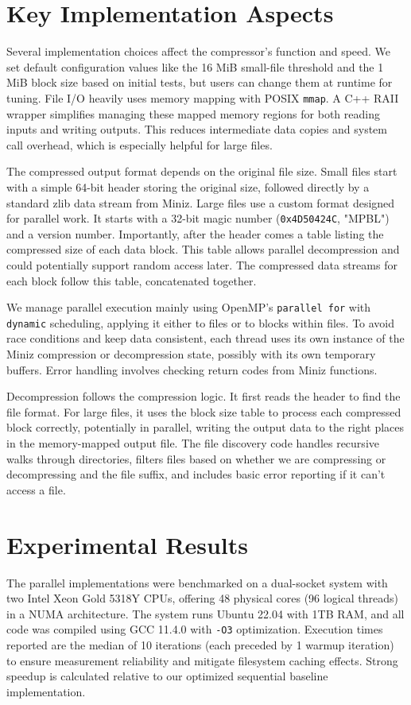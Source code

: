 \documentclass[10pt]{article}
\newcommand{\code}[1]{\texttt{#1}}
\begin{document}
\section{Key Implementation Aspects}

Several implementation choices affect the compressor's function and speed. We set default configuration values like the 16 MiB small-file threshold and the 1 MiB block size based on initial tests, but users can change them at runtime for tuning.
File I/O heavily uses memory mapping with POSIX \code{mmap}. A C++ RAII wrapper simplifies managing these mapped memory regions for both reading inputs and writing outputs. This reduces intermediate data copies and system call overhead, which is especially helpful for large files.

The compressed output format depends on the original file size. Small files start with a simple 64-bit header storing the original size, followed directly by a standard zlib data stream from Miniz. Large files use a custom format designed for parallel work. It starts with a 32-bit magic number (\code{0x4D50424C}, "MPBL") and a version number. Importantly, after the header comes a table listing the compressed size of each data block. This table allows parallel decompression and could potentially support random access later. The compressed data streams for each block follow this table, concatenated together.

We manage parallel execution mainly using OpenMP's \code{parallel for} with \code{dynamic} scheduling, applying it either to files or to blocks within files. To avoid race conditions and keep data consistent, each thread uses its own instance of the Miniz compression or decompression state, possibly with its own temporary buffers. Error handling involves checking return codes from Miniz functions.

Decompression follows the compression logic. It first reads the header to find the file format. For large files, it uses the block size table to process each compressed block correctly, potentially in parallel, writing the output data to the right places in the memory-mapped output file. The file discovery code handles recursive walks through directories, filters files based on whether we are compressing or decompressing and the file suffix, and includes basic error reporting if it can't access a file.


\section{Experimental Results} \label{sec:results}
The parallel implementations were benchmarked on a dual-socket system with two Intel Xeon Gold 5318Y CPUs, offering 48 physical cores (96 logical threads) in a NUMA architecture. The system runs Ubuntu 22.04 with 1TB RAM, and all code was compiled using GCC 11.4.0 with \code{-O3} optimization. Execution times reported are the median of 10 iterations (each preceded by 1 warmup iteration) to ensure measurement reliability and mitigate filesystem caching effects. Strong speedup is calculated relative to our optimized sequential baseline implementation.
\end{document}
